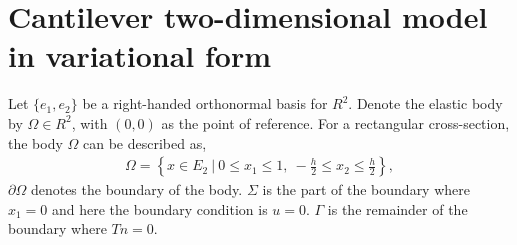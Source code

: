 \section{Cantilever two-dimensional model in variational form}\label{ssec:2D_Model:FEM}
Let $\{e_1,e_2\}$ be a right-handed orthonormal basis for $R^2$. Denote the elastic body by $\Omega \in R^2$, with $(0,0)$ as the point of reference. For a rectangular cross-section, the body $\Omega$ can be described as,
\begin{eqnarray*}
	\Omega = \left \{ x \in E_2 \ | \ 0 \leq x_1 \leq 1, \ -\frac{h}{2} \leq x_2 \leq \frac{h}{2} \right \},
\end{eqnarray*} 
$\partial \Omega$ denotes the boundary of the body. $\Sigma$ is the part of the boundary where $x_1 = 0$ and here the boundary condition is $u = 0$. $\Gamma$ is the remainder of the boundary where $Tn = 0$.

\FloatBarrier

